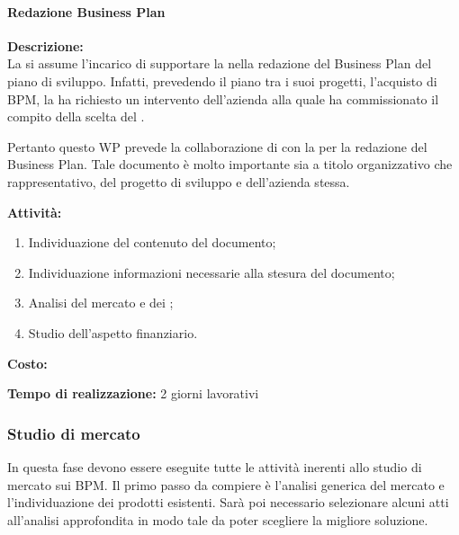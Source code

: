 \paragraph{Redazione Business Plan}
\begin{description}
\item{\bfseries Descrizione:}\\
La \team si assume l'incarico di supportare la \customer nella redazione  del Business Plan del piano di sviluppo. Infatti, prevedendo il piano tra i suoi progetti, l'acquisto di \sw BPM, la \customer ha richiesto un intervento dell'azienda alla quale ha commissionato il compito della scelta del \sw.

Pertanto questo WP prevede la collaborazione di \team con la \customer per la redazione del Business Plan. Tale documento è molto importante sia a titolo organizzativo che rappresentativo, del progetto di sviluppo e dell'azienda stessa.
  \item  {\bfseries Attività:}
  \begin{enumerate}
		\item Individuazione del contenuto del documento;
		\item Individuazione informazioni necessarie alla stesura del documento;
		\item Analisi del mercato e dei ;
		\item Studio dell'aspetto finanziario.
	\end{enumerate}
  \item{\bfseries Costo:}
  \item{\bfseries Tempo di realizzazione:} 2 giorni lavorativi
\end{description}

\subsubsection{Studio di mercato}
In questa fase devono essere eseguite tutte le attività inerenti allo studio di mercato sui \sw BPM\@.
Il primo passo da compiere è l'analisi generica del mercato e l'individuazione dei prodotti esistenti. Sarà poi necessario selezionare alcuni \sw atti all'analisi approfondita in modo tale da poter scegliere la migliore soluzione. 

